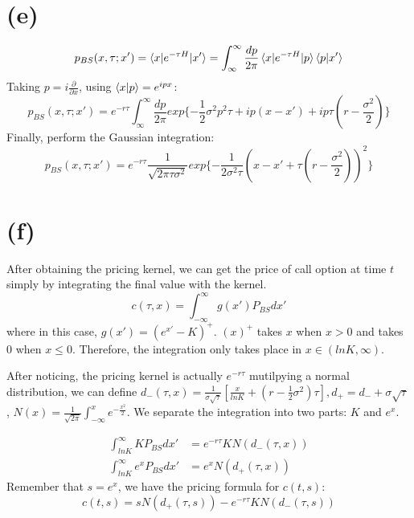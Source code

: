 \documentclass[12pt,a4paper]{paper}
\begin{document}
\section{(e)}
\begin{equation}
p_{BS}(x, \tau; x') = \braket{x|e^{-\tau H}|x'} = \int_{\infty}^{\infty} \frac{dp}{2\pi}\braket{x|e^{-\tau H}|p}\braket{p|x'}
\end{equation}
Taking $p = i \frac{\partial}{\partial x}$, using $\braket{x|p} = e^{ipx}$:
\begin{equation}
p_{BS}(x, \tau;x') = e^{-r\tau}\int_{\infty}^{\infty}\frac{dp}{2\pi}exp\{- \frac{1}{2}\sigma^2p^2\tau + ip(x - x') + ip\tau(r - \frac{\sigma^2}{2}) \}
\end{equation}
Finally, perform the Gaussian integration:
\begin{equation}
p_{BS}(x, \tau;x') = e^{-r\tau} \frac{1}{\sqrt{2\pi \tau \sigma^2}} exp\{ - \frac{1}{2 \sigma^2 \tau}(x - x' + \tau(r - \frac{\sigma^2}{2}) )^2 \}
\end{equation}

\section{(f)}
After obtaining the pricing kernel, we can get the price of call option at time $t$ simply by integrating the final value with the kernel.
\begin{equation}
c(\tau, x) = \int_{- \infty}^{\infty} g(x') P_{BS} dx'
\end{equation}
where in this case, $g(x') = (e^{x'} - K)^{+}$. $(x)^{+}$ takes $x$ when $x > 0$ and takes $0$ when $x \leq 0$. Therefore, the integration only takes place in $x \in (lnK, \infty)$.\par
After noticing, the pricing kernel is actually $e^{-r \tau}$ mutilpying a normal distribution, we can define $d_{-}(\tau, x) = \frac{1}{\sigma\sqrt{\tau}} [\frac{x}{lnK} + (r - \frac{1}{2}\sigma^2)\tau], d_{+} = d_{-} + \sigma \sqrt{\tau}$, $N(x) = \frac{1}{\sqrt{2\pi}}\int_{-\infty}^x e^{-\frac{x^2}{2}}$. We separate the integration into two parts: $K$ and $e^x$.\par
\begin{subequations}
\begin{align}
\int_{lnK}^{\infty} K P_{BS} dx' &= e^{-r\tau}KN(d_{-}(\tau, x)) \\
\int_{lnK}^{\infty} e^x P_{BS} dx' &= e^{x}N(d_{+}(\tau, x))
\end{align}
\end{subequations}
Remember that $s = e^{x}$, we have the pricing formula for $c(t, s)$:
\begin{equation}
c(t, s) = sN(d_{+}(\tau, s)) - e^{-r\tau} K N(d_{-}(\tau, s))
\end{equation}
\end{document}
